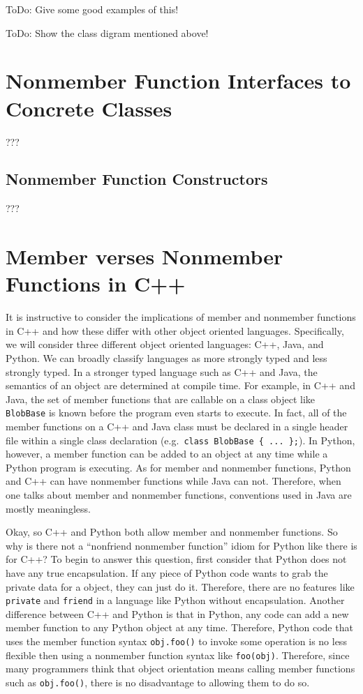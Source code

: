 \documentclass[pdf,ps2pdf,11pt]{SANDreport}
\begin{document}
ToDo: Give some good examples of this!

ToDo: Show the class digram mentioned above!

%
\section{Nonmember Function Interfaces to Concrete Classes}
%

???

%
\subsection{Nonmember Function Constructors}
%

???


%
\section{Member verses Nonmember Functions in C++}
%

It is instructive to consider the implications of member and nonmember
functions in C++ and how these differ with other object oriented languages.
Specifically, we will consider three different object oriented languages: C++,
Java, and Python.  We can broadly classify languages as more strongly typed
and less strongly typed.  In a stronger typed language such as C++ and Java,
the semantics of an object are determined at compile time.  For example, in
C++ and Java, the set of member functions that are callable on a class object
like {}\texttt{BlobBase} is known before the program even starts to execute.
In fact, all of the member functions on a C++ and Java class must be declared
in a single header file within a single class declaration (e.g.\
{}\texttt{class BlobBase \{ ... \};}).  In Python, however, a member function
can be added to an object at any time while a Python program is executing.  As
for member and nonmember functions, Python and C++ can have nonmember
functions while Java can not.  Therefore, when one talks about member and
nonmember functions, conventions used in Java are mostly meaningless.

Okay, so C++ and Python both allow member and nonmember functions. So why is
there not a ``nonfriend nonmember function'' idiom for Python like there is
for C++?  To begin to answer this question, first consider that Python does
not have any true encapsulation.  If any piece of Python code wants to grab
the private data for a object, they can just do it.  Therefore, there are no
features like {}\texttt{private} and {}\texttt{friend} in a language like
Python without encapsulation.  Another difference between C++ and Python is
that in Python, any code can add a new member function to any Python object at
any time.  Therefore, Python code that uses the member function syntax
{}\texttt{obj.foo()} to invoke some operation is no less flexible then using a
nonmember function syntax like {}\texttt{foo(obj)}.  Therefore, since many
programmers think that object orientation means calling member functions such
as {}\texttt{obj.foo()}, there is no disadvantage to allowing them to do so.
\end{document}
